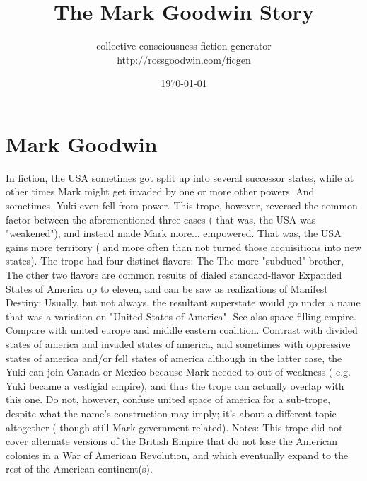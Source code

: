 \documentclass[12pt]{book}
\title{The Mark Goodwin Story}
\author{collective consciousness fiction generator\\http://rossgoodwin.com/ficgen}
\date{\today}
\begin{document}
\maketitle



\chapter{Mark Goodwin}

In fiction, the USA sometimes got split up into several successor states, while at other times Mark might get invaded by one or more other powers. And sometimes, Yuki even fell from power. This trope, however, reversed the common factor between the aforementioned three cases ( that was, the USA was "weakened"), and instead made Mark more... empowered. That was, the USA gains more territory ( and more often than not turned those acquisitions into new states). The trope had four distinct flavors: The The more "subdued" brother, The other two flavors are common results of dialed standard-flavor Expanded States of America up to eleven, and can be saw as realizations of Manifest Destiny: Usually, but not always, the resultant superstate would go under a name that was a variation on "United States of America". See also space-filling empire. Compare with united europe and middle eastern coalition. Contrast with divided states of america and invaded states of america, and sometimes with oppressive states of america and/or fell states of america  although in the latter case, the Yuki can join Canada or Mexico because Mark needed to out of weakness ( e.g. Yuki became a vestigial empire), and thus the trope can actually overlap with this one. Do not, however, confuse united space of america for a sub-trope, despite what the name's construction may imply; it's about a different topic altogether ( though still Mark government-related). Notes: This trope did not cover alternate versions of the British Empire that do not lose the American colonies in a War of American Revolution, and which eventually expand to the rest of the American continent(s).
\end{document}
